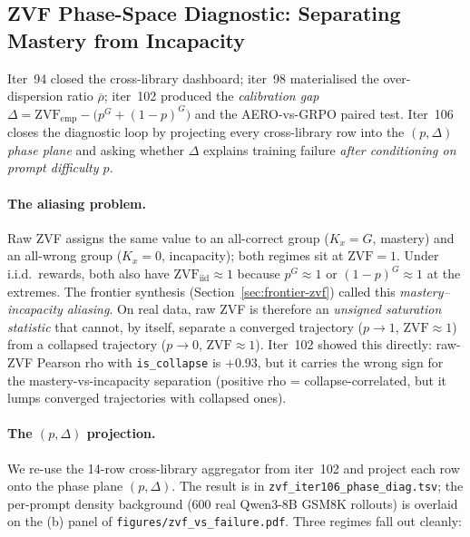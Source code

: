 
\subsection{ZVF Phase-Space Diagnostic: Separating Mastery from Incapacity}
\label{sec:zvf-phase}

Iter~94 closed the cross-library dashboard; iter~98 materialised the
over-dispersion ratio $\overline{\rho}$; iter~102 produced the
\emph{calibration gap} $\Delta = \mathrm{ZVF}_{\mathrm{emp}} -
\bigl(p^{G}+(1-p)^{G}\bigr)$ and the AERO-vs-GRPO paired test. Iter~106
closes the diagnostic loop by projecting every cross-library row into
the \emph{$(p,\Delta)$ phase plane} and asking whether $\Delta$ explains
training failure \emph{after conditioning on prompt difficulty $p$}.

\paragraph{The aliasing problem.}
Raw ZVF assigns the same value to an all-correct group ($K_x{=}G$,
mastery) and an all-wrong group ($K_x{=}0$, incapacity); both regimes
sit at $\mathrm{ZVF}=1$. Under i.i.d.\ rewards, both also have
$\mathrm{ZVF}_{\mathrm{iid}}\approx 1$ because $p^{G}\approx 1$ or
$(1-p)^{G}\approx 1$ at the extremes. The frontier synthesis
(Section~\ref{sec:frontier-zvf}) called this \emph{mastery--incapacity
aliasing}. On real data, raw ZVF is therefore an \emph{unsigned
saturation statistic} that cannot, by itself, separate a converged
trajectory ($p\to 1$, $\mathrm{ZVF}\approx 1$) from a collapsed
trajectory ($p\to 0$, $\mathrm{ZVF}\approx 1$). Iter~102 showed this
directly: raw-ZVF Pearson rho with \texttt{is\_collapse} is
$+0.93$, but it carries the wrong sign for the mastery-vs-incapacity
separation (positive rho = collapse-correlated, but it lumps converged
trajectories with collapsed ones).

\paragraph{The $(p,\Delta)$ projection.}
We re-use the 14-row cross-library aggregator from iter~102 and project
each row onto the phase plane $(p,\Delta)$. The result is in
\texttt{zvf\_iter106\_phase\_diag.tsv}; the per-prompt density background
(600 real Qwen3-8B GSM8K rollouts) is overlaid on the (b) panel of
\texttt{figures/zvf\_vs\_failure.pdf}. Three regimes fall out cleanly:

